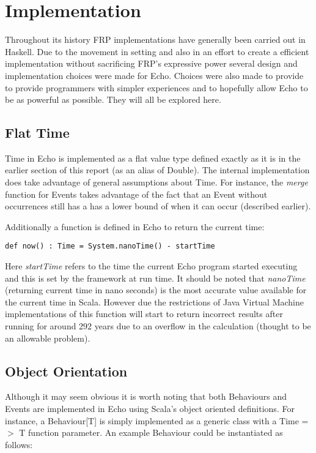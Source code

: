 \chapter{Implementation}
  Throughout its history FRP implementations have generally been carried out in Haskell. Due to the movement
  in setting and also in an effort to create a efficient implementation without sacrificing FRP's expressive power
  several design and implementation choices were made for Echo. Choices were also made
  to provide to provide programmers with simpler experiences and to hopefully allow Echo to be
  as powerful as possible. They will all be explored here.

  \section{Flat Time}
    Time in Echo is implemented as a flat value type defined exactly as it is in the earlier
    section of this report (as an alias of Double). The internal implementation does take advantage
    of general assumptions about Time. For instance, the \emph{merge} function for Events takes advantage
    of the fact that an Event without occurrences still has a has a lower bound of when it can occur (described
    earlier). 
    
    Additionally a function is defined in Echo to return the current time:
    
\begin{verbatim}
def now() : Time = System.nanoTime() - startTime
\end{verbatim}      

    Here \emph{startTime} refers to the time the current Echo program started executing and this is
    set by the framework at run time. It should be noted that \emph{nanoTime} (returning current time in
    nano seconds) is the most accurate value available for the current time in Scala. However due the restrictions
    of Java Virtual Machine implementations of this function will start to return incorrect results 
    after running for around 292 years due to an overflow in the calculation (thought to be an allowable
    problem).
    
  \section{Object Orientation}
    Although it may seem obvious it is worth noting that both Behaviours and Events are implemented in
    Echo using Scala's object oriented definitions. For instance, a Behaviour[T] is simply
    implemented as a generic class with a Time =$>$ T function parameter. An example Behaviour
    could be instantiated as follows:

